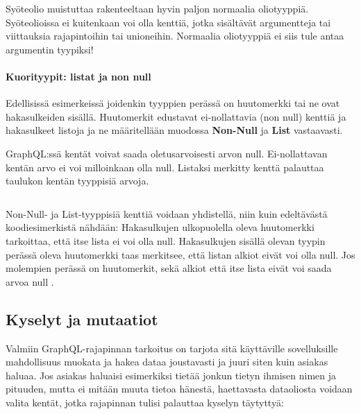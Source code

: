\inputminted{gql.py:GraphQLLexer -x}{listaukset/input.graphql}

Syöteolio muistuttaa rakenteeltaan hyvin paljon normaalia oliotyyppiä. Syöteolioissa ei kuitenkaan voi olla kenttiä, jotka sisältävät argumentteja tai viittauksia rajapintoihin tai unioneihin. Normaalia oliotyyppiä ei siis tule antaa argumentin tyypiksi! \cite{graphql-spec}

\paragraph{Kuorityypit: listat ja non null} Edellisissä esimerkeissä joidenkin tyyppien perässä on huutomerkki tai ne ovat hakasulkeiden sisällä. Huutomerkit edustavat ei-nollattavia (non null) kenttiä ja hakasulkeet listoja ja ne määritellään muodossa \textbf{Non-Null} ja \textbf{List} vastaavasti.

GraphQL:ssä kentät voivat saada oletusarvoisesti arvon null. Ei-nollattavan kentän arvo ei voi milloinkaan olla null. Listaksi merkitty kenttä palauttaa taulukon kentän tyyppisiä arvoja.

\inputminted{gql.py:GraphQLLexer -x}{listaukset/wrapper.graphql}

Non-Null- ja List-tyyppisiä kenttiä voidaan yhdistellä, niin kuin edeltävästä koodiesimerkistä nähdään: Hakasulkujen ulkopuolella oleva huutomerkki tarkoittaa, että itse lista ei voi olla null. Hakasulkujen sisällä olevan tyypin perässä oleva huutomerkki taas merkitsee, että listan alkiot eivät voi olla null. Jos molempien perässä on huutomerkit, sekä alkiot että itse lista eivät voi saada arvoa null \cite{graphql-spec, SchemasAndTypes}.




\subsection{Kyselyt ja mutaatiot}
\label{Kyselyt ja mutaatiot}

Valmiin GraphQL-rajapinnan tarkoitus on tarjota sitä käyttäville sovelluksille mahdollisuus muokata ja hakea dataa joustavasti ja juuri siten kuin asiakas haluaa. Jos asiakas haluaisi esimerkiksi tietää jonkun tietyn ihmisen nimen ja pituuden, mutta ei mitään muuta tietoa hänestä, haettavasta dataoliosta voidaan valita kentät, jotka rajapinnan tulisi palauttaa kyselyn täytyttyä:

\inputminted{gql.py:GraphQLLexer -x}{listaukset/esimerkki1.graphql}

